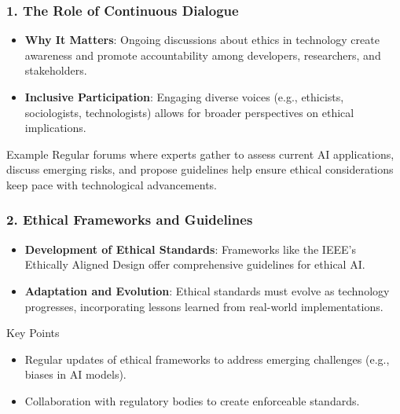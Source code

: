 \documentclass[aspectratio=169]{beamer}
\begin{document}
\begin{frame}[fragile]
    \frametitle{1. The Role of Continuous Dialogue}
    \begin{itemize}
        \item \textbf{Why It Matters}: Ongoing discussions about ethics in technology create awareness and promote accountability among developers, researchers, and stakeholders.
        \item \textbf{Inclusive Participation}: Engaging diverse voices (e.g., ethicists, sociologists, technologists) allows for broader perspectives on ethical implications.
    \end{itemize}
    
    \begin{block}{Example}
        Regular forums where experts gather to assess current AI applications, discuss emerging risks, and propose guidelines help ensure ethical considerations keep pace with technological advancements.
    \end{block}
\end{frame}

\begin{frame}[fragile]
    \frametitle{2. Ethical Frameworks and Guidelines}
    \begin{itemize}
        \item \textbf{Development of Ethical Standards}: Frameworks like the IEEE's Ethically Aligned Design offer comprehensive guidelines for ethical AI.
        \item \textbf{Adaptation and Evolution}: Ethical standards must evolve as technology progresses, incorporating lessons learned from real-world implementations.
    \end{itemize}
    
    \begin{block}{Key Points}
        \begin{itemize}
            \item Regular updates of ethical frameworks to address emerging challenges (e.g., biases in AI models).
            \item Collaboration with regulatory bodies to create enforceable standards.
        \end{itemize}
    \end{block}
\end{frame}
\end{document}
